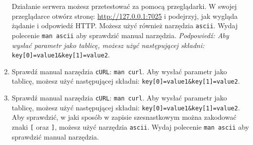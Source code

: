 \begin{enumerate}[label=\textbf{7.\arabic*}]
\noindent Działanie serwera możesz przetestować za pomocą przeglądarki. W swojej przeglądarce otwórz stronę: \url{http://127.0.0.1:7025} i podejrzyj, jak wygląda żądanie i odpowiedź HTTP. Możesz użyć również narzędzia \texttt{ascii}. Wydaj polecenie \texttt{man ascii} aby sprawdzić manual narzędzia. \textit{Podpowiedź: Aby wysłać parametr jako tablicę, możesz użyć następującej składni:} \texttt{key[0]=value1\&key[1]=value2}.

\item Sprawdź manual narzędzia \texttt{cURL}: \texttt{man curl}. Aby wysłać parametr jako tablicę, możesz użyć następującej składni:  \texttt{key[0]=value1\&key[1]=value2}.
\item Sprawdź manual narzędzia \texttt{cURL}: \texttt{man curl}. Aby wysłać parametr jako tablicę, możesz użyć następującej składni:  \texttt{key[0]=value1\&key[1]=value2}. Aby sprawdzić,  w jaki sposób w zapisie szesnastkowym można zakodować znaki \texttt{[} oraz \texttt{]}, możesz użyć narzędzia \texttt{ascii}. Wydaj polecenie \texttt{man ascii} aby sprawdzić manual narzędzia.
 


\end{enumerate}

